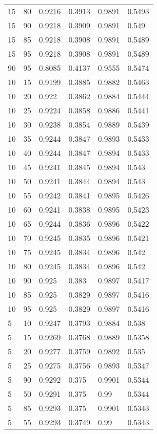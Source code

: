\begin{center}
\begin{longtable}{|l|l|l|l|l|l|}
15 & 80 & 0.9216 & 0.3913 & 0.9891 & 0.5493 \\
15 & 90 & 0.9218 & 0.3909 & 0.9891 & 0.549  \\
15 & 85 & 0.9218 & 0.3908 & 0.9891 & 0.5489 \\
15 & 95 & 0.9218 & 0.3908 & 0.9891 & 0.5489 \\
90 & 95 & 0.8085 & 0.4137 & 0.9555 & 0.5474 \\
10 & 15 & 0.9199 & 0.3885 & 0.9882 & 0.5463 \\
10 & 20 & 0.922  & 0.3862 & 0.9884 & 0.5444 \\
10 & 25 & 0.9224 & 0.3858 & 0.9886 & 0.5441 \\
10 & 30 & 0.9238 & 0.3854 & 0.9889 & 0.5439 \\
10 & 35 & 0.9244 & 0.3847 & 0.9893 & 0.5433 \\
10 & 40 & 0.9244 & 0.3847 & 0.9894 & 0.5433 \\
10 & 45 & 0.9241 & 0.3845 & 0.9894 & 0.543  \\
10 & 50 & 0.9241 & 0.3844 & 0.9894 & 0.543  \\
10 & 55 & 0.9242 & 0.3841 & 0.9895 & 0.5426 \\
10 & 60 & 0.9241 & 0.3838 & 0.9895 & 0.5423 \\
10 & 65 & 0.9244 & 0.3836 & 0.9896 & 0.5422 \\
10 & 70 & 0.9245 & 0.3835 & 0.9896 & 0.5421 \\
10 & 75 & 0.9245 & 0.3834 & 0.9896 & 0.542  \\
10 & 80 & 0.9245 & 0.3834 & 0.9896 & 0.542  \\
10 & 90 & 0.925  & 0.383  & 0.9897 & 0.5417 \\
10 & 85 & 0.925  & 0.3829 & 0.9897 & 0.5416 \\
10 & 95 & 0.925  & 0.3829 & 0.9897 & 0.5416 \\
5  & 10 & 0.9247 & 0.3793 & 0.9884 & 0.538  \\
5  & 15 & 0.9269 & 0.3768 & 0.9889 & 0.5358 \\
5  & 20 & 0.9277 & 0.3759 & 0.9892 & 0.535  \\
5  & 25 & 0.9275 & 0.3756 & 0.9893 & 0.5347 \\
5  & 90 & 0.9292 & 0.375  & 0.9901 & 0.5344 \\
5  & 50 & 0.9291 & 0.375  & 0.99   & 0.5344 \\
5  & 85 & 0.9293 & 0.375  & 0.9901 & 0.5343 \\
5  & 55 & 0.9293 & 0.3749 & 0.99   & 0.5343 \\

\end{longtable}
\end{center}
